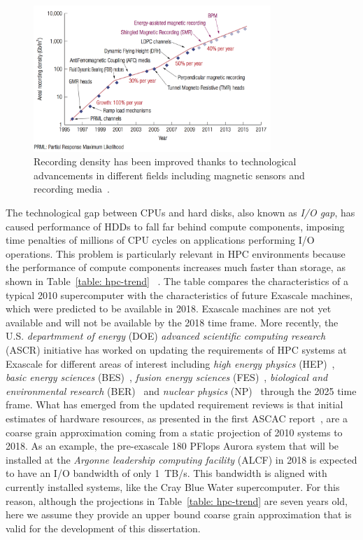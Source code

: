 \begin{figure}[!htb]
\centering
\includegraphics[width=0.8\textwidth]{figures/hdd-trend}
\caption{Recording density has been improved thanks to technological advancements in different fields including magnetic sensors and recording media~\cite{Shiroishi2009}.}
\label{figure: hdd-trend}
\end{figure}

The technological gap between CPUs and hard disks, also known as \textit{I/O gap}, has caused performance of HDDs to fall far behind compute components, imposing time penalties of millions of CPU cycles on 
applications performing I/O operations. This problem is particularly relevant in HPC environments because the performance of compute components increases much faster than storage, as shown in Table~\ref{table: hpc-trend}
~\cite{ASCAC2010}. The table compares the characteristics of a typical 2010 supercomputer with the characteristics of future Exascale machines, which were predicted to be available in 2018. Exascale machines are not yet 
available and will not be available by the 2018 time frame. More recently, the U.S. \textit{departmment of energy} (DOE) \textit{advanced scientific computing research} (ASCR) initiative has worked on updating the requirements 
of HPC systems at Exascale for different areas of interest including \textit{high energy physics} (HEP)~\cite{HEP2015}, \textit{basic energy sciences} (BES)~\cite{BES2015}, \textit{fusion energy sciences} (FES)~\cite{FES2016}, 
\textit{biological and environmental research} (BER)~\cite{BER2016} and \textit{nuclear physics} (NP)~\cite{NP2016} through the 2025 time frame. What has emerged from the updated requirement reviews is that initial estimates of
hardware resources, as presented in the first ASCAC report~\cite{ASCAC2010}, are a coarse grain approximation coming from a static projection of 2010 systems to 2018. As an example, the pre-exascale 180 PFlops Aurora system that 
will be installed at the \textit{Argonne leadership computing facility} (ALCF) in 2018 is expected to have an I/O bandwidth of only 1~TB/s. This bandwidth is aligned with currently installed systems, like the Cray Blue Water 
supercomputer. For this reason, although the projections in Table~\ref{table: hpc-trend} are seven years old, here we assume they provide an upper bound coarse grain approximation that is valid for the development of this
dissertation.

